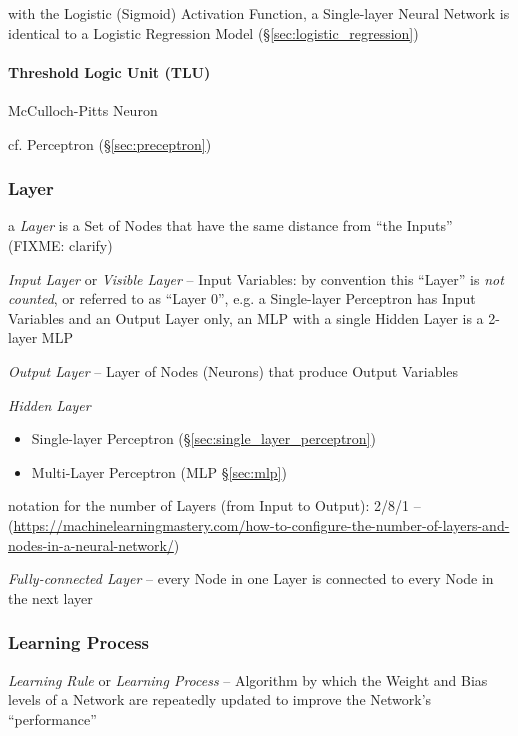 with the Logistic (Sigmoid) Activation Function, a Single-layer Neural Network
is identical to a Logistic Regression Model (\S\ref{sec:logistic_regression})



\paragraph{Threshold Logic Unit (TLU)}\label{sec:tlu}\hfill

McCulloch-Pitts Neuron

cf. Perceptron (\S\ref{sec:preceptron})



\subsubsection{Layer}\label{sec:ann_layer}

a \emph{Layer} is a Set of Nodes that have the same distance from ``the Inputs''
(FIXME: clarify)

\emph{Input Layer} or \emph{Visible Layer} -- Input Variables: by convention
this ``Layer'' is \emph{not counted}, or referred to as ``Layer $0$'', e.g. a
Single-layer Perceptron has Input Variables and an Output Layer only, an MLP
with a single Hidden Layer is a 2-layer MLP

\emph{Output Layer} -- Layer of Nodes (Neurons) that produce Output Variables

\emph{Hidden Layer}

\begin{itemize}
  \item Single-layer Perceptron (\S\ref{sec:single_layer_perceptron})
  \item Multi-Layer Perceptron (MLP \S\ref{sec:mlp})
\end{itemize}

notation for the number of Layers (from Input to Output): 2/8/1 --
(\url{https://machinelearningmastery.com/how-to-configure-the-number-of-layers-and-nodes-in-a-neural-network/})

\emph{Fully-connected Layer} -- every Node in one Layer is connected to every
Node in the next layer



\subsubsection{Learning Process}\label{sec:learning_process}

\emph{Learning Rule} or \emph{Learning Process} -- Algorithm by which the Weight
and Bias levels of a Network are repeatedly updated to improve the Network's
``performance''

